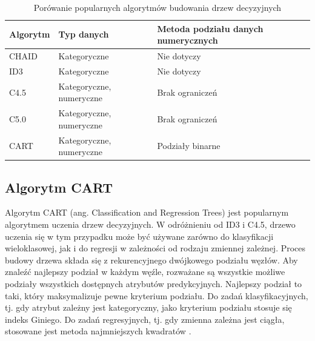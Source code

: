 \documentclass[10pt,a4paper]{article}
\begin{document}
\begin{table}[ht]
\centering
\caption{Porówanie popularnych algorytmów budowania drzew decyzyjnych}
\label{decision_algo}
\begin{tabular}{@{}lll@{}}
\toprule
\textbf{Algorytm}                    & \textbf{Typ danych}      & \textbf{Metoda podziału danych numerycznych} \\ \midrule
CHAID \cite{Kass1980}                & Kategoryczne             & Nie dotyczy                                  \\ \midrule
ID3 \cite{Quinlan1986}               & Kategoryczne             & Nie dotyczy                                  \\ \midrule
C4.5 \cite{Quinlan1993}              & Kategoryczne, numeryczne & Brak ograniczeń                              \\ \midrule
C5.0                                 & Kategoryczne, numeryczne & Brak ograniczeń                              \\ \midrule
CART \cite{Breiman1984}              & Kategoryczne, numeryczne & Podziały binarne                             \\ \bottomrule
\end{tabular}
\end{table}

\subsection{Algorytm CART}
\label{sub:CART}
Algorytm CART (ang. Classification and Regression Trees) jest popularnym algorytmem uczenia drzew decyzyjnych. W odróżnieniu od ID3 i C4.5, drzewo uczenia się w tym przypadku może być używane zarówno do klasyfikacji wieloklasowej, jak i do regresji w zależności od rodzaju zmiennej zależnej. Proces budowy drzewa składa się z rekurencyjnego dwójkowego podziału węzłów. Aby znaleźć najlepszy podział w każdym węźle, rozważane są wszystkie możliwe podziały wszystkich dostępnych atrybutów predykcyjnych. Najlepszy podział to taki, który maksymalizuje pewne kryterium podziału. Do zadań klasyfikacyjnych, tj. gdy atrybut zależny jest kategoryczny, jako kryterium podziału stosuje się indeks Giniego. Do zadań regresyjnych, tj. gdy zmienna zależna jest ciągła, stosowane jest metoda najmniejszych kwadratów \cite{MazumdarWWW, Breiman1984, Brownlee2017}.
\end{document}

